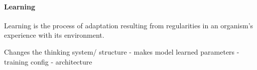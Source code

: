 \documentclass[a4paper]{standalone}
\title{}
\begin{document}
   \maketitle
            \paragraph{Learning}

               \cite{de-houwer-2013-what-is-learning-on-the-nature-and-merits-of-a-functional-definition-of-learning}
               Learning is the process of adaptation resulting from regularities in an organism's experience with its environment.

               Changes the thinking system/ structure
               - makes model learned parameters
               - training config
               - architecture
\end{document}
